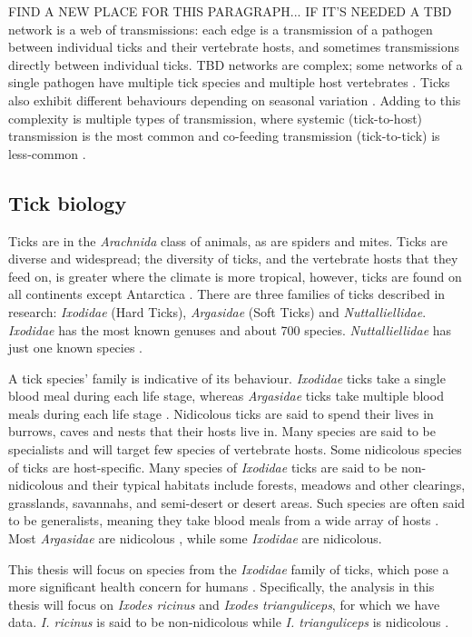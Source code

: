 \documentclass{article}
\begin{document}
FIND A NEW PLACE FOR THIS PARAGRAPH... IF IT'S NEEDED
A TBD network is a web of transmissions: each edge is a transmission of a pathogen between individual ticks and their vertebrate hosts, and sometimes transmissions directly between individual ticks. TBD networks are complex; some networks of a single pathogen have multiple tick species and multiple host vertebrates \cite{Johnson2023e}. Ticks also exhibit different behaviours depending on seasonal variation \cite{Johnson2023k}. Adding to this complexity is multiple types of transmission, where systemic (tick-to-host) transmission is the most common and co-feeding transmission (tick-to-tick) is less-common \cite{HARRISON2012}.

\subsection{Tick biology}

Ticks are in the \textit{Arachnida} class of animals, as are spiders and mites. Ticks are diverse and widespread; the diversity of ticks, and the vertebrate hosts that they feed on, is greater where the climate is more tropical, however, ticks are found on all continents except Antarctica \cite{Johnson2023a}. There are three families of ticks described in research: \textit{Ixodidae} (Hard Ticks), \textit{Argasidae} (Soft Ticks) and \textit{Nuttalliellidae}. \textit{Ixodidae} has the most known genuses and about 700 species. \textit{Nuttalliellidae} has just one known species \cite{Nicholson2019}.

A tick species' family is indicative of its behaviour. \textit{Ixodidae} ticks take a single blood meal during each life stage, whereas \textit{Argasidae} ticks take multiple blood meals during each life stage \cite{Johnson2023d}. Nidicolous ticks are said to spend their lives in burrows, caves and nests that their hosts live in. Many species are said to be specialists and will target few species of vertebrate hosts. Some nidicolous species of ticks are host-specific. Many species of \textit{Ixodidae} ticks are said to be non-nidicolous and their typical habitats include forests, meadows and other clearings, grasslands, savannahs, and semi-desert or desert areas. Such species are often said to be generalists, meaning they take blood meals from a wide array of hosts \cite{Nicholson2019}. Most \textit{Argasidae} are nidicolous \cite{Vial2009}, while some \textit{Ixodidae} are nidicolous. 

This thesis will focus on species from the \textit{Ixodidae} family of ticks, which pose a more significant health concern for humans \cite{Parola2001}. Specifically, the analysis in this thesis will focus on \textit{Ixodes ricinus} and \textit{Ixodes trianguliceps}, for which we have data. \textit{I. ricinus} is said to be non-nidicolous while \textit{I. trianguliceps} is nidicolous \cite{Nicholson2019}.
\end{document}
